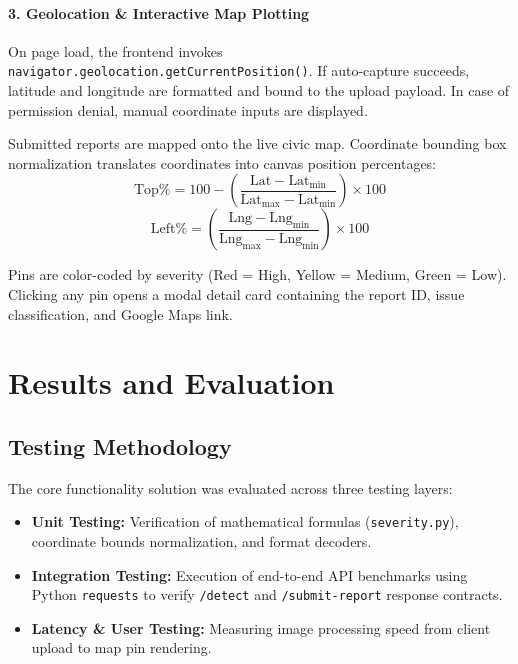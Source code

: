 \documentclass{tietreport}
\begin{document}
\subsubsection{3. Geolocation \& Interactive Map Plotting}
On page load, the frontend invokes \texttt{navigator.geolocation.getCurrentPosition()}. If auto-capture succeeds, latitude and longitude are formatted and bound to the upload payload. In case of permission denial, manual coordinate inputs are displayed.

Submitted reports are mapped onto the live civic map. Coordinate bounding box normalization translates coordinates into canvas position percentages:
\begin{equation}
  \text{Top\%} = 100 - \left( \frac{\text{Lat} - \text{Lat}_{\min}}{\text{Lat}_{\max} - \text{Lat}_{\min}} \right) \times 100
\end{equation}
\begin{equation}
  \text{Left\%} = \left( \frac{\text{Lng} - \text{Lng}_{\min}}{\text{Lng}_{\max} - \text{Lng}_{\min}} \right) \times 100
\end{equation}

Pins are color-coded by severity (Red = High, Yellow = Medium, Green = Low). Clicking any pin opens a modal detail card containing the report ID, issue classification, and Google Maps link.



\chapter{Results and Evaluation}

\section{Testing Methodology}

The core functionality solution was evaluated across three testing layers:
\begin{itemize}
  \item \textbf{Unit Testing:} Verification of mathematical formulas (\texttt{severity.py}), coordinate bounds normalization, and format decoders.
  \item \textbf{Integration Testing:} Execution of end-to-end API benchmarks using Python \texttt{requests} to verify \texttt{/detect} and \texttt{/submit-report} response contracts.
  \item \textbf{Latency \& User Testing:} Measuring image processing speed from client upload to map pin rendering.
\end{itemize}
\end{document}
